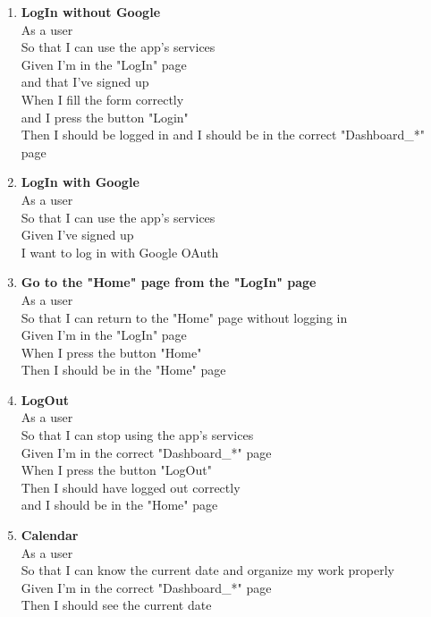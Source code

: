 \documentclass[Lau, binding=0.6cm, oneside]{sapthesis}
\begin{document}
\begin{enumerate}
	\item \textbf{LogIn without Google}\\
			As a user\\
			So that I can use the app’s services\\
			Given I’m in the "LogIn" page\\
			and that I’ve signed up\\
			When I fill the form correctly\\
			and I press the button "Login"\\
			Then I should be logged in and I should be in the correct "Dashboard\_*" page\\
	\item \textbf{LogIn with Google}\\
			As a user\\
			So that I can use the app’s services\\
			Given I’ve signed up\\
			I want to log in with Google OAuth\\
	\item \textbf{Go to the "Home" page from the "LogIn" page}\\
			As a user\\
			So that I can return to the "Home" page without logging in\\
			Given I’m in the "LogIn" page\\
			When I press the button "Home"\\
			Then I should be in the "Home" page\\
	\item \textbf{LogOut}\\
			As a user\\
			So that I can stop using the app’s services\\
			Given I’m in the correct "Dashboard\_*" page\\
			When I press the button "LogOut"\\
			Then I should have logged out correctly\\
			and I should be in the "Home" page\\
	\item \textbf{Calendar}\\
			As a user\\
			So that I can know the current date and organize my work properly\\
			Given I’m in the correct "Dashboard\_*" page\\
			Then I should see the current date\\

\end{enumerate}
\end{document}
